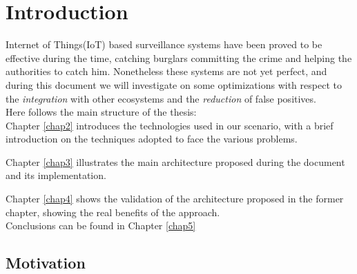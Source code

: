 \chapter{Introduction}
\label{chap1}


Internet of Things(IoT) based surveillance systems have been proved to be effective during the time,
catching burglars committing the crime and helping the authorities to
catch him\cite{fbrobbery}. Nonetheless these systems are not yet perfect, and during
this document we will investigate on some optimizations with respect to
the \textit{integration} with other ecosystems and the \textit{reduction}
of false positives.\\
Here follows the main structure of the thesis:\\

Chapter \ref{chap2} introduces the technologies used in our scenario, with a brief
introduction on the techniques adopted to face the various problems.

Chapter \ref{chap3} illustrates the main architecture proposed
during the document and its implementation.

Chapter \ref{chap4} shows the validation of the architecture proposed in the former
chapter, showing the real benefits of the approach.\\
Conclusions can be found in Chapter \ref{chap5}


\section{Motivation}

